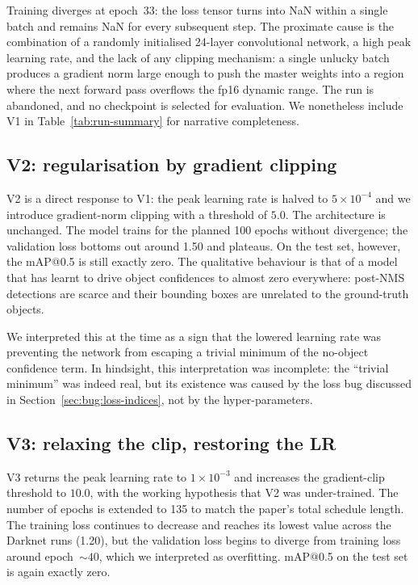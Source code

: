 Training diverges at epoch~33: the loss tensor turns into NaN within a single
batch and remains NaN for every subsequent step. The proximate cause is the
combination of a randomly initialised 24-layer convolutional network, a
high peak learning rate, and the lack of any clipping mechanism: a single
unlucky batch produces a gradient norm large enough to push the master weights
into a region where the next forward pass overflows the fp16 dynamic range.
The run is abandoned, and no checkpoint is selected for evaluation. We
nonetheless include V1 in Table~\ref{tab:run-summary} for narrative
completeness.

\subsection{V2: regularisation by gradient clipping}
\label{sec:experiments:v2}

V2 is a direct response to V1: the peak learning rate is halved to
$5\!\times\!10^{-4}$ and we introduce gradient-norm clipping with a threshold
of $5.0$. The architecture is unchanged. The model trains for the planned
100 epochs without divergence; the validation loss bottoms out around 1.50 and
plateaus. On the test set, however, the mAP@0.5 is still exactly zero. The
qualitative behaviour is that of a model that has learnt to drive object
confidences to almost zero everywhere: post-NMS detections are scarce and
their bounding boxes are unrelated to the ground-truth objects.

We interpreted this at the time as a sign that the lowered learning rate was
preventing the network from escaping a trivial minimum of the no-object
confidence term. In hindsight, this interpretation was incomplete: the
``trivial minimum'' was indeed real, but its existence was caused by the loss
bug discussed in Section~\ref{sec:bug:loss-indices}, not by the
hyper-parameters.

\subsection{V3: relaxing the clip, restoring the LR}
\label{sec:experiments:v3}

V3 returns the peak learning rate to $1\!\times\!10^{-3}$ and increases the
gradient-clip threshold to $10.0$, with the working hypothesis that V2 was
under-trained. The number of epochs is extended to 135 to match the paper's
total schedule length. The training loss continues to decrease and reaches its
lowest value across the Darknet runs (1.20), but the validation loss begins to
diverge from training loss around epoch~$\sim 40$, which we interpreted as
overfitting. mAP@0.5 on the test set is again exactly zero.

